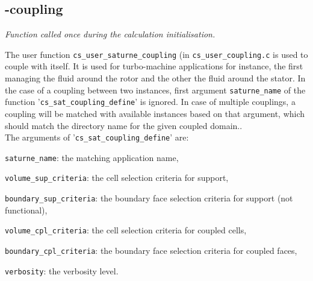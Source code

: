 
\subsection{\CS-\CS coupling}

\noindent
\textit{Function called once during the calculation initialisation.}

The user function \texttt{cs\_user\_saturne\_coupling} (in
 \texttt{cs\_user\_coupling.c} is used to couple \CS with itself.
 It is used for turbo-machine applications for instance, the first \CS managing
 the fluid around the rotor and the other the fluid around the stator.
In the case of a coupling between two \CS instances, first argument \texttt{saturne\_name}
 of the function '\texttt{cs\_sat\_coupling\_define}' is ignored.
 In case of multiple couplings, a coupling will be matched with available \CS
 instances based on that argument, which should match the directory name for the
 given coupled domain..\\
The arguments of '\texttt{cs\_sat\_coupling\_define}' are:
\begin{list}{-}{}
\item \texttt{saturne\_name}: the matching \CS application name,
\item \texttt{volume\_sup\_criteria}: the cell selection criteria for support,
\item \texttt{boundary\_sup\_criteria}: the boundary face selection criteria for support (not functional),
\item \texttt{volume\_cpl\_criteria}: the cell selection criteria for coupled cells,
\item \texttt{boundary\_cpl\_criteria}: the boundary face selection criteria for coupled faces,
\item \texttt{verbosity}: the verbosity level.
\end{list}


